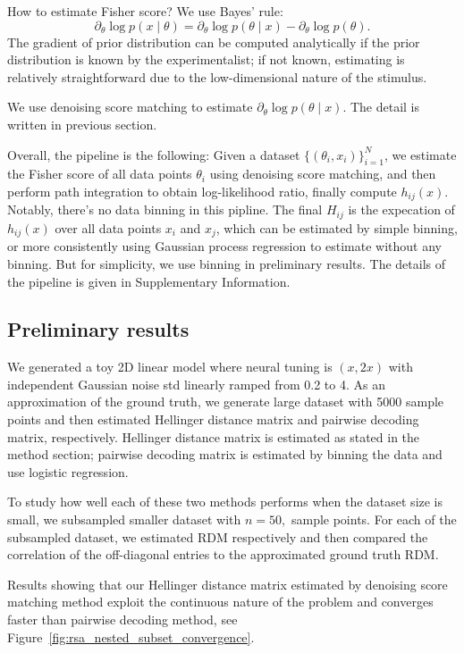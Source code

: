 How to estimate Fisher score? We use Bayes' rule:
\[
\partial_\theta \log p(x\mid \theta)
=
\partial_\theta \log p(\theta\mid x)-\partial_\theta \log p(\theta).
\]
The gradient of prior distribution can be computed analytically if the prior distribution is known by the experimentalist; if not known, estimating is relatively straightforward due to the low-dimensional nature of the stimulus.

We use denoising score matching to estimate $\partial_\theta \log p(\theta\mid x)$. The detail is written in previous section.

Overall, the pipeline is the following: Given a dataset $\{(\theta_i,x_i)\}_{i=1}^N$, we estimate the Fisher score of all data points $\theta_i$ using denoising score matching, and then perform path integration to obtain log-likelihood ratio, finally compute $h_{ij}(x)$. Notably, there's no data binning in this pipline. The final $H_{ij}$ is the expecation of $h_{ij}(x)$ over all data points $x_i$ and $x_j$, which can be estimated by simple binning, or more consistently using Gaussian process regression to estimate without any binning. But for simplicity, we use binning in preliminary results. The details of the pipeline is given in Supplementary Information.

\subsection{Preliminary results}

We generated a toy 2D linear model where neural tuning is $(x, 2x)$ with independent Gaussian noise std linearly ramped from 0.2 to 4. As an approximation of the ground truth, we generate large dataset with 5000 sample points and then estimated Hellinger distance matrix and pairwise decoding matrix, respectively. Hellinger distance matrix is estimated as stated in the method section; pairwise decoding matrix is estimated by binning the data and use logistic regression.

To study how well each of these two methods performs when the dataset size is small, we subsampled smaller dataset with $n = 50, $ sample points. For each of the subsampled dataset, we estimated RDM respectively and then compared the correlation of the off-diagonal entries to the approximated ground truth RDM.

Results showing that our Hellinger distance matrix estimated by denoising score matching method exploit the continuous nature of the problem and converges faster than pairwise decoding method, see Figure~\ref{fig:rsa_nested_subset_convergence}.


